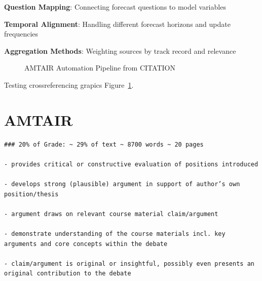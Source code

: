 \documentclass[
  11pt,
  letterpaper,
]{book}
\begin{document}
\textbf{Question Mapping}: Connecting forecast questions to model
variables

\textbf{Temporal Alignment}: Handling different forecast horizons and
update frequencies

\textbf{Aggregation Methods}: Weighting sources by track record and
relevance

\begin{figure}


\caption[Five-step AMTAIR automation pipeline from PDFs to Bayesian
networks]{\label{fig-automation_pipeline}AMTAIR Automation Pipeline from
CITATION}

\end{figure}%

Testing crossreferencing grapics Figure~\ref{fig-automation_pipeline}.


\chapter{AMTAIR}\label{amtair}

\begin{verbatim}
### 20% of Grade: ~ 29% of text ~ 8700 words ~ 20 pages

- provides critical or constructive evaluation of positions introduced

- develops strong (plausible) argument in support of author’s own position/thesis

- argument draws on relevant course material claim/argument

- demonstrate understanding of the course materials incl. key arguments and core concepts within the debate

- claim/argument is original or insightful, possibly even presents an original contribution to the debate 
\end{verbatim}
\end{document}
